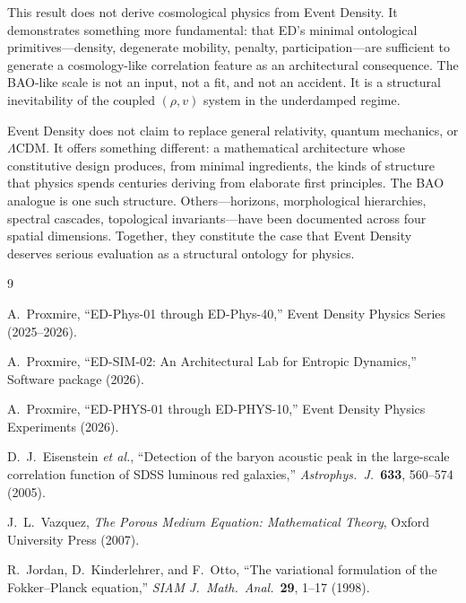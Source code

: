 \documentclass[11pt]{article}
\begin{document}
This result does not derive cosmological physics from Event Density. It demonstrates something more fundamental: that ED's minimal ontological primitives---density, degenerate mobility, penalty, participation---are sufficient to generate a cosmology-like correlation feature as an architectural consequence. The BAO-like scale is not an input, not a fit, and not an accident. It is a structural inevitability of the coupled \((\rho, v)\) system in the underdamped regime.

Event Density does not claim to replace general relativity, quantum mechanics, or \(\Lambda\)CDM. It offers something different: a mathematical architecture whose constitutive design produces, from minimal ingredients, the kinds of structure that physics spends centuries deriving from elaborate first principles. The BAO analogue is one such structure. Others---horizons, morphological hierarchies, spectral cascades, topological invariants---have been documented across four spatial dimensions. Together, they constitute the case that Event Density deserves serious evaluation as a structural ontology for physics.

\begin{thebibliography}{9}

A.~Proxmire, ``ED-Phys-01 through ED-Phys-40,'' Event Density Physics Series (2025--2026).

A.~Proxmire, ``ED-SIM-02: An Architectural Lab for Entropic Dynamics,'' Software package (2026).

A.~Proxmire, ``ED-PHYS-01 through ED-PHYS-10,'' Event Density Physics Experiments (2026).

D.~J.~Eisenstein \emph{et al.}, ``Detection of the baryon acoustic peak in the large-scale correlation function of SDSS luminous red galaxies,'' \emph{Astrophys.\ J.}\ \textbf{633}, 560--574 (2005).

J.~L.~Vazquez, \emph{The Porous Medium Equation: Mathematical Theory}, Oxford University Press (2007).

R.~Jordan, D.~Kinderlehrer, and F.~Otto, ``The variational formulation of the Fokker--Planck equation,'' \emph{SIAM J.\ Math.\ Anal.}\ \textbf{29}, 1--17 (1998).

\end{thebibliography}
\end{document}
